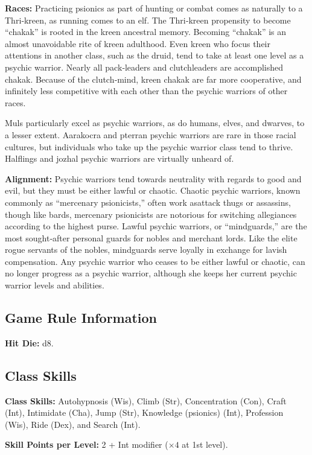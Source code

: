 \textbf{Races:} Practicing psionics as part of hunting or combat comes as naturally to a Thri‐kreen, as running comes to an elf. The Thri‐kreen propensity to become “chakak” is rooted in the kreen ancestral memory. Becoming “chakak” is an almost unavoidable rite of kreen adulthood. Even kreen who focus their attentions in another class, such as the druid, tend to take at least one level as a psychic warrior. Nearly all pack‐leaders and clutchleaders are accomplished chakak. Because of the clutch‐mind, kreen chakak are far more cooperative, and infinitely less competitive with each other than the psychic warriors of other races.

Muls particularly excel as psychic warriors, as do humans, elves, and dwarves, to a lesser extent. Aarakocra and pterran psychic warriors are rare in those racial cultures, but individuals who take up the psychic warrior class tend to thrive. Halflings and jozhal psychic warriors are virtually unheard of.

\textbf{Alignment:} Psychic warriors tend towards neutrality with regards to good and evil, but they must be either lawful or chaotic. Chaotic psychic warriors, known commonly as “mercenary psionicists,” often work asattack thugs or assassins, though like bards, mercenary psionicists are notorious for switching allegiances according to the highest purse. Lawful psychic warriors, or “mindguards,” are the most sought‐after personal guards for nobles and merchant lords. Like the elite rogue servants of the nobles, mindguards serve loyally in exchange for lavish compensation. Any psychic warrior who ceases to be either lawful or chaotic, can no longer progress as a psychic warrior, although she keeps her current psychic warrior levels and abilities.

\subsection{Game Rule Information}

\textbf{Hit Die:} d8.

\subsection{Class Skills}

\textbf{Class Skills:} Autohypnosis (Wis), Climb (Str), Concentration (Con), Craft (Int), Intimidate (Cha), Jump (Str), Knowledge (psionics) (Int), Profession (Wis), Ride (Dex), and Search (Int).

\textbf{Skill Points per Level:} 2 + Int modifier ($\times 4$ at 1st level).

